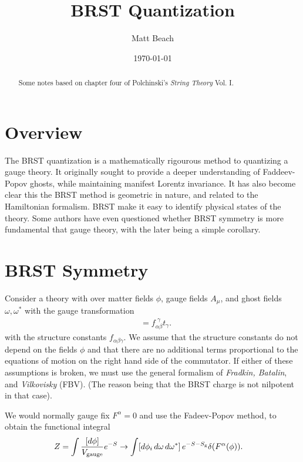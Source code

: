 \documentclass[notitlepage,amsmath,amssymb,aps, pra, 10pt]{revtex4-1}
\begin{document}
\title{BRST Quantization }

\author{Matt Beach}
\date{\today}
\begin{abstract}
    Some notes based on chapter four of Polchinski's \emph{String Theory} Vol. I.
\end{abstract}
\maketitle
\tableofcontents

\section{Overview}
    The BRST quantization is a mathematically rigourous method to quantizing a gauge theory. It originally sought to provide a deeper understanding of Faddeev-Popov ghosts, while maintaining manifest Lorentz invariance. It has also become clear this the BRST method is geometric in nature, and related to the Hamiltonian formalism. BRST make it easy to identify physical states of the theory. Some authors have even questioned whether BRST symmetry is more fundamental that gauge theory, with the later being a simple corollary.

\section{BRST Symmetry}
    Consider a theory with over matter fields $\phi$, gauge fields $A_{\mu}$, and ghost fields $\omega, \omega^*$ with the gauge transformation
    \begin{align}
        [t_{\alpha}, t_{\beta}] &= f^{\,\,\gamma}_{\alpha\beta} t_{\gamma}.
    \end{align}
    with the structure constants $f_{\alpha\beta\gamma}$. We assume that the structure constants do not depend on the fields $\phi$ and that there are no additional terms proportional to the equations of motion on the right hand side of the commutator. If either of these assumptions is broken, we must use the general formalism of \emph{Fradkin, Batalin}, and \emph{Vilkovisky} (FBV). (The reason being that the BRST charge is not nilpotent in that case).

    We would normally gauge fix $F^{\alpha} = 0$ and use the Fadeev-Popov method, to obtain the functional integral
    \begin{align}
        Z &= \int \frac{[d\phi] }{V_{\rm gauge}}e^{-S} \rightarrow \int [d \phi_i\, d\omega \,d\omega^*]\, e^{-S  -S_{\rm g}} \delta(F^{\alpha}(\phi)).
    \end{align}
\end{document}
